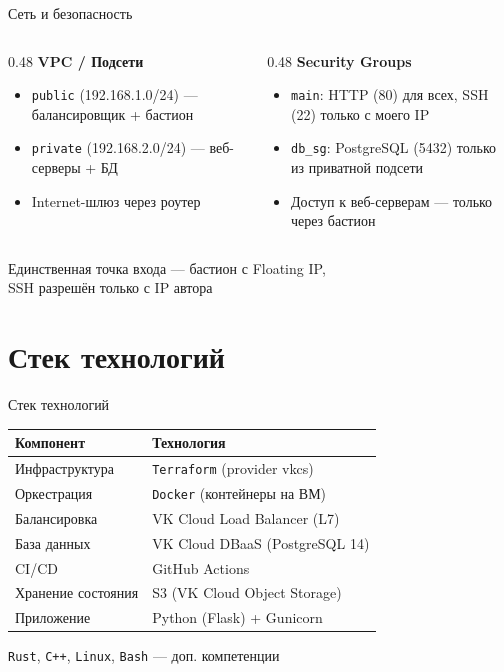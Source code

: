 \documentclass[10pt,aspectratio=169]{beamer}
\begin{document}
\begin{frame}{Сеть и безопасность}

  \begin{columns}[T]
    \begin{column}{0.48\textwidth}
      \textbf{VPC / Подсети}
      \begin{itemize}
        \item \texttt{public} (192.168.1.0/24) --- балансировщик + бастион
        \item \texttt{private} (192.168.2.0/24) --- веб-серверы + БД
        \item Internet-шлюз через роутер
      \end{itemize}
    \end{column}
    \begin{column}{0.48\textwidth}
      \textbf{Security Groups}
      \begin{itemize}
        \item \texttt{main}: HTTP (80) для всех, SSH (22) только с моего IP
        \item \texttt{db\_sg}: PostgreSQL (5432) только из приватной подсети
        \item Доступ к веб-серверам --- только через бастион
      \end{itemize}
    \end{column}
  \end{columns}

  \vspace{0.5cm}
  \begin{alertblock}{}
    \centering
    Единственная точка входа --- бастион с Floating IP, \\
    SSH разрешён только с IP автора
  \end{alertblock}
\end{frame}

\section{Стек технологий}

\begin{frame}{Стек технологий}
  \centering
  \begin{tabular}{ll}
    \toprule
    \textbf{Компонент} & \textbf{Технология} \\
    \midrule
    Инфраструктура & \texttt{Terraform} (provider vkcs) \\
    Оркестрация & \texttt{Docker} (контейнеры на ВМ) \\
    Балансировка & VK Cloud Load Balancer (L7) \\
    База данных & VK Cloud DBaaS (PostgreSQL 14) \\
    CI/CD & GitHub Actions \\
    Хранение состояния & S3 (VK Cloud Object Storage) \\
    Приложение & Python (Flask) + Gunicorn \\
    \bottomrule
  \end{tabular}

  \vspace{0.4cm}
  \texttt{Rust}, \texttt{C++}, \texttt{Linux}, \texttt{Bash} --- доп. компетенции
\end{frame}
\end{document}
